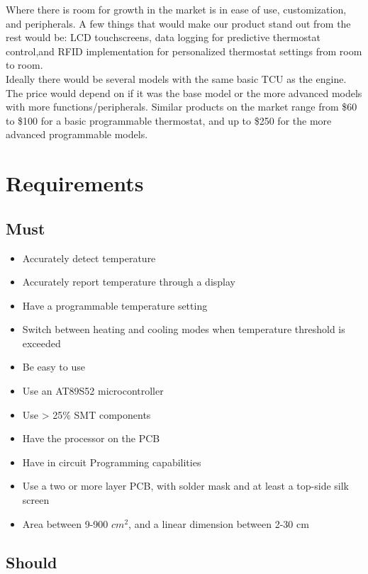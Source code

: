 \documentclass[11pt]{article}
\begin{document}
Where there is room for growth in the market is in ease of use, customization, and peripherals. A few things that would make our product stand out from the rest would be: LCD touchscreens, data logging for predictive thermostat control,and RFID implementation for personalized thermostat settings from room to room.\\

Ideally there would be several models with the same basic TCU as the engine. The price would depend on if it was the base model or the more advanced models with more functions/peripherals. Similar products on the market range from \$60 to \$100 for a basic programmable thermostat, and up to \$250 for the more advanced programmable models.


\section*{Requirements}
\subsection*{Must}
\begin{itemize}
    \item Accurately detect temperature 
    \item Accurately report temperature through a display
    \item Have a programmable temperature setting
    \item Switch between heating and cooling modes when temperature threshold is exceeded 
    \item Be easy to use
    \item Use an AT89S52 microcontroller
    \item Use > 25\% SMT components
    \item Have the processor on the PCB 
    \item Have in circuit Programming capabilities
    \item Use a two or more layer PCB, with solder mask and at least a top-side silk screen
    \item Area between 9-900 $cm^2$, and a linear dimension between 2-30 cm

\end{itemize}

\subsection*{Should}
\end{document}
